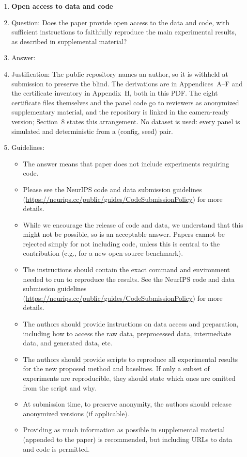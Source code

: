 \begin{enumerate}
\item {\bf Open access to data and code}
    \item[] Question: Does the paper provide open access to the data and code, with sufficient instructions to faithfully reproduce the main experimental results, as described in supplemental material?
    \item[] Answer: \answerNo{}
    \item[] Justification: The public repository names an author, so it is withheld at submission to preserve the blind. The derivations are in Appendices~A--F and the certificate inventory in Appendix~H, both in this PDF. The eight certificate files themselves and the panel code go to reviewers as anonymized supplementary material, and the repository is linked in the camera-ready version; Section~8 states this arrangement. No dataset is used: every panel is simulated and deterministic from a (config, seed) pair.
    \item[] Guidelines:
    \begin{itemize}
        \item The answer \answerNA{} means that paper does not include experiments requiring code.
        \item Please see the NeurIPS code and data submission guidelines (\url{https://neurips.cc/public/guides/CodeSubmissionPolicy}) for more details.
        \item While we encourage the release of code and data, we understand that this might not be possible, so \answerNo{} is an acceptable answer. Papers cannot be rejected simply for not including code, unless this is central to the contribution (e.g., for a new open-source benchmark).
        \item The instructions should contain the exact command and environment needed to run to reproduce the results. See the NeurIPS code and data submission guidelines (\url{https://neurips.cc/public/guides/CodeSubmissionPolicy}) for more details.
        \item The authors should provide instructions on data access and preparation, including how to access the raw data, preprocessed data, intermediate data, and generated data, etc.
        \item The authors should provide scripts to reproduce all experimental results for the new proposed method and baselines. If only a subset of experiments are reproducible, they should state which ones are omitted from the script and why.
        \item At submission time, to preserve anonymity, the authors should release anonymized versions (if applicable).
        \item Providing as much information as possible in supplemental material (appended to the paper) is recommended, but including URLs to data and code is permitted.
    \end{itemize}



\end{enumerate}
